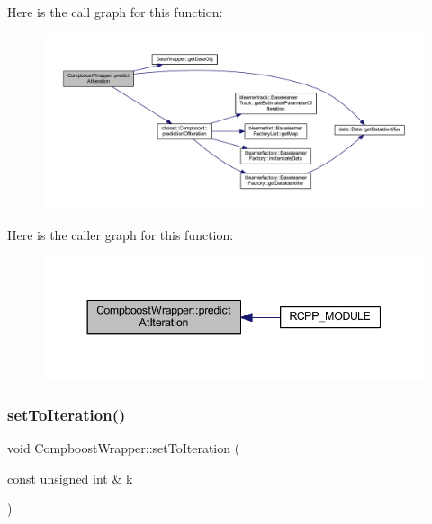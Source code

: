 Here is the call graph for this function\+:\nopagebreak
\begin{figure}[H]
\begin{center}
\leavevmode
\includegraphics[width=350pt]{class_compboost_wrapper_a72b9c303a13fb3f6f8346c0af0796496_cgraph}
\end{center}
\end{figure}
Here is the caller graph for this function\+:\nopagebreak
\begin{figure}[H]
\begin{center}
\leavevmode
\includegraphics[width=344pt]{class_compboost_wrapper_a72b9c303a13fb3f6f8346c0af0796496_icgraph}
\end{center}
\end{figure}
\mbox{\label{class_compboost_wrapper_a3f8ebe1d821b3bfa5e6d0d04beff0211}} 
\subsubsection{\texorpdfstring{set\+To\+Iteration()}{setToIteration()}}
{\footnotesize\ttfamily void Compboost\+Wrapper\+::set\+To\+Iteration (\begin{DoxyParamCaption}\item[{const unsigned int \&}]{k }\end{DoxyParamCaption})\hspace{0.3cm}{\ttfamily [inline]}}

